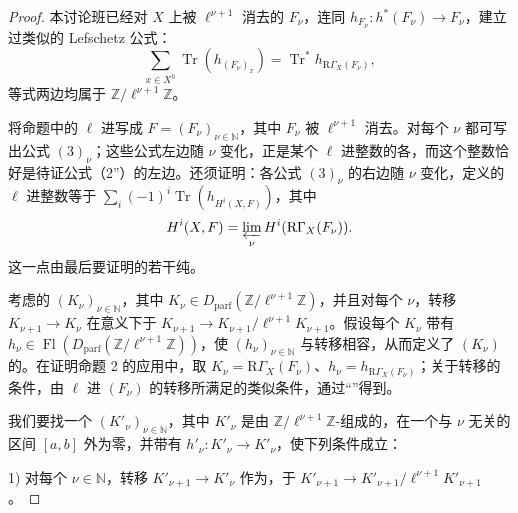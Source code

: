 \begin{proof}
本讨论班已经对 $X$ 上被 $\ell^{\nu+1}$ 消去的 $F_\nu$，连同 $h_{F_\nu}:h^*(F_\nu)\to F_\nu$，建立过类似的 Lefschetz 公式：
\[
\sum_{x\in X^h}\operatorname{Tr}(h_{(F_\nu)_x})
=\operatorname{Tr}^{*}h_{\mathrm R\Gamma_X(F_\nu)},
\tag{3}
\]
等式两边均属于 $\mathbb Z/\ell^{\nu+1}\mathbb Z$。

将命题中的 $\ell$ 进写成 $F=(F_\nu)_{\nu\in\mathbb N}$，其中 $F_\nu$ 被 $\ell^{\nu+1}$ 消去。对每个 $\nu$ 都可写出公式 $(3)_\nu$；这些公式左边随 $\nu$ 变化，正是某个 $\ell$ 进整数的各，而这个整数恰好是待证公式（2''）的左边。还须证明：各公式 $(3)_\nu$ 的右边随 $\nu$ 变化，定义的 $\ell$ 进整数等于 $\sum_i(-1)^i\operatorname{Tr}(h_{H^i(X,F)})$，其中
\[
H^i(X,F)=\varprojlim_\nu H^i(\mathrm R\Gamma_X(F_\nu)).
\]
这一点由最后要证明的若干纯。

考虑的 $(K_\nu)_{\nu\in\mathbb N}$，其中 $K_\nu\in D_{\mathrm{parf}}(\mathbb Z/\ell^{\nu+1}\mathbb Z)$，并且对每个 $\nu$，转移
$K_{\nu+1}\to K_\nu$ 在意义下于 $K_{\nu+1}\to K_{\nu+1}/\ell^{\nu+1}K_{\nu+1}$。假设每个 $K_\nu$ 带有 $h_\nu\in\operatorname{Fl}(D_{\mathrm{parf}}(\mathbb Z/\ell^{\nu+1}\mathbb Z))$，使 $(h_\nu)_{\nu\in\mathbb N}$ 与转移相容，从而定义了 $(K_\nu)$ 的。在证明命题 2 的应用中，取 $K_\nu=\mathrm R\Gamma_X(F_\nu)$、$h_\nu=h_{\mathrm R\Gamma_X(F_\nu)}$；关于转移的条件，由 $\ell$ 进 $(F_\nu)$ 的转移所满足的类似条件，通过“”得到。

我们要找一个 $(K'_\nu)_{\nu\in\mathbb N}$，其中 $K'_\nu$ 是由 $\mathbb Z/\ell^{\nu+1}\mathbb Z$-组成的，在一个与 $\nu$ 无关的区间 $[a,b]$ 外为零，并带有 $h'_\nu:K'_\nu\to K'_\nu$，使下列条件成立：

1) 对每个 $\nu\in\mathbb N$，转移 $K'_{\nu+1}\to K'_\nu$ 作为，于 $K'_{\nu+1}\to K'_{\nu+1}/\ell^{\nu+1}K'_{\nu+1}$。


\end{proof}
